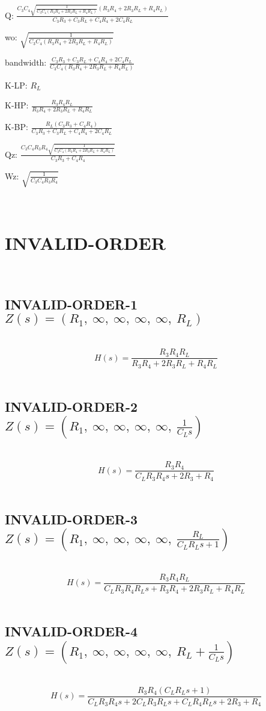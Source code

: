\documentclass{article}
\begin{document}
Q: $\frac{C_{3} C_{4} \sqrt{\frac{1}{C_{3} C_{4} \left(R_{3} R_{4} + 2 R_{3} R_{L} + R_{4} R_{L}\right)}} \left(R_{3} R_{4} + 2 R_{3} R_{L} + R_{4} R_{L}\right)}{C_{3} R_{3} + C_{3} R_{L} + C_{4} R_{4} + 2 C_{4} R_{L}}$\ 

wo: $\sqrt{\frac{1}{C_{3} C_{4} \left(R_{3} R_{4} + 2 R_{3} R_{L} + R_{4} R_{L}\right)}}$\ 

bandwidth: $\frac{C_{3} R_{3} + C_{3} R_{L} + C_{4} R_{4} + 2 C_{4} R_{L}}{C_{3} C_{4} \left(R_{3} R_{4} + 2 R_{3} R_{L} + R_{4} R_{L}\right)}$\ 

K-LP: $R_{L}$\ 

K-HP: $\frac{R_{3} R_{4} R_{L}}{R_{3} R_{4} + 2 R_{3} R_{L} + R_{4} R_{L}}$\ 

K-BP: $\frac{R_{L} \left(C_{3} R_{3} + C_{4} R_{4}\right)}{C_{3} R_{3} + C_{3} R_{L} + C_{4} R_{4} + 2 C_{4} R_{L}}$\ 

Qz: $\frac{C_{3} C_{4} R_{3} R_{4} \sqrt{\frac{1}{C_{3} C_{4} \left(R_{3} R_{4} + 2 R_{3} R_{L} + R_{4} R_{L}\right)}}}{C_{3} R_{3} + C_{4} R_{4}}$\ 

Wz: $\sqrt{\frac{1}{C_{3} C_{4} R_{3} R_{4}}}$\ 

\ 

\section{INVALID-ORDER}\ 
\subsection{INVALID-ORDER-1 $Z(s) = \left( R_{1}, \  \infty, \  \infty, \  \infty, \  \infty, \  R_{L}\right)$ } \ 
\textbf{\[H(s) = \frac{R_{3} R_{4} R_{L}}{R_{3} R_{4} + 2 R_{3} R_{L} + R_{4} R_{L}}\] } \ 
\subsection{INVALID-ORDER-2 $Z(s) = \left( R_{1}, \  \infty, \  \infty, \  \infty, \  \infty, \  \frac{1}{C_{L} s}\right)$ } \ 
\textbf{\[H(s) = \frac{R_{3} R_{4}}{C_{L} R_{3} R_{4} s + 2 R_{3} + R_{4}}\] } \ 
\subsection{INVALID-ORDER-3 $Z(s) = \left( R_{1}, \  \infty, \  \infty, \  \infty, \  \infty, \  \frac{R_{L}}{C_{L} R_{L} s + 1}\right)$ } \ 
\textbf{\[H(s) = \frac{R_{3} R_{4} R_{L}}{C_{L} R_{3} R_{4} R_{L} s + R_{3} R_{4} + 2 R_{3} R_{L} + R_{4} R_{L}}\] } \ 
\subsection{INVALID-ORDER-4 $Z(s) = \left( R_{1}, \  \infty, \  \infty, \  \infty, \  \infty, \  R_{L} + \frac{1}{C_{L} s}\right)$ } \ 
\textbf{\[H(s) = \frac{R_{3} R_{4} \left(C_{L} R_{L} s + 1\right)}{C_{L} R_{3} R_{4} s + 2 C_{L} R_{3} R_{L} s + C_{L} R_{4} R_{L} s + 2 R_{3} + R_{4}}\] } \ 
\end{document}
